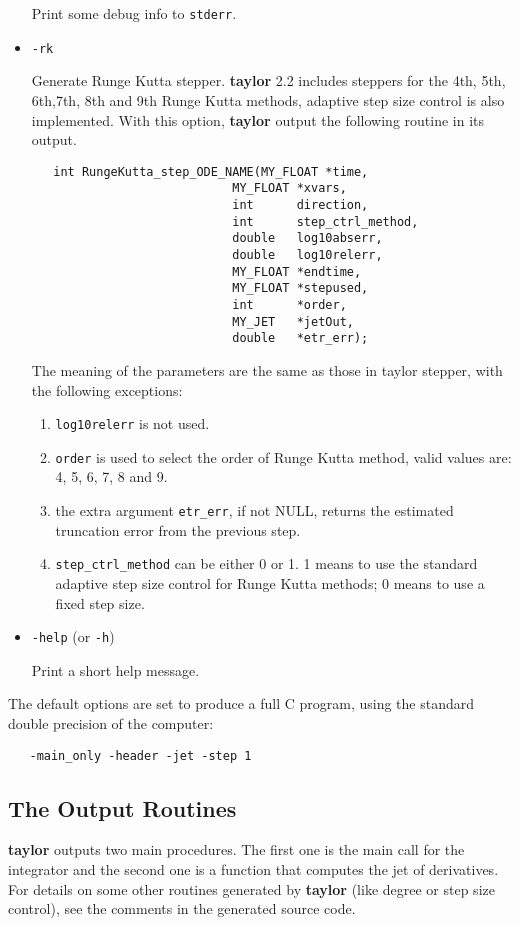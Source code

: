 \documentclass[10pt]{article}
\theoremstyle{remark}
\newcommand{\taylorname}{{\bf taylor}}
\begin{document}
\begin{itemize}
{{Print some debug info to \verb+stderr+.}
}
\item {
{\verb+-rk+ 

Generate Runge Kutta stepper.  \taylorname{} 2.2 includes steppers for
the 4th, 5th, 6th,7th, 8th and 9th Runge Kutta methods, adaptive step
size control is also implemented.  With this option, \taylorname{}
output the following routine in its output.

\begin{verbatim}
   int RungeKutta_step_ODE_NAME(MY_FLOAT *time,
                            MY_FLOAT *xvars,
                            int      direction,
                            int      step_ctrl_method,
                            double   log10abserr,
                            double   log10relerr,
                            MY_FLOAT *endtime,
                            MY_FLOAT *stepused,
                            int      *order,
                            MY_JET   *jetOut,
                            double   *etr_err);
\end{verbatim}
The meaning of the parameters are the same as those in taylor stepper,
with the following exceptions:
\begin{enumerate}
    \item  \verb+log10relerr+ is not used.
    \item \verb+order+ is used to select the order of Runge Kutta
      method, valid values are: 4, 5, 6, 7, 8 and 9.
    \item the extra argument \verb+etr_err+, if not NULL, returns the
      estimated truncation error from the previous step.
    \item{\verb+step_ctrl_method+ can be either 0 or 1.  1 means to
      use the standard adaptive step size control for Runge Kutta
      methods; 0 means to use a fixed step size.}
\end{enumerate}
}
}
\item {
{\verb+-help+ (or \verb+-h+)

Print a short help message.}
}
\end{itemize}

\noindent
The default options are set to produce a full C program, using the
standard double precision of the computer:
\begin{verbatim}
   -main_only -header -jet -step 1
\end{verbatim}

\subsection{The Output Routines}\label{sec:or}
\taylorname{} outputs two main procedures. The first one is the main
call for the integrator and the second one is a function that computes
the jet of derivatives. For details on some other routines generated
by \taylorname{} (like degree or step size control), see the comments
in the generated source code.
\end{document}
